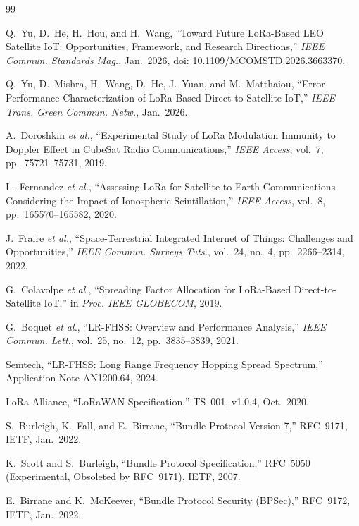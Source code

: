 \documentclass[11pt,a4paper]{article}
\begin{document}
\begin{thebibliography}{99}

Q.~Yu, D.~He, H.~Hou, and H.~Wang, ``Toward Future LoRa-Based LEO Satellite IoT: Opportunities, Framework, and Research Directions,'' \emph{IEEE Commun. Standards Mag.}, Jan.~2026, doi: 10.1109/MCOMSTD.2026.3663370.

Q.~Yu, D.~Mishra, H.~Wang, D.~He, J.~Yuan, and M.~Matthaiou, ``Error Performance Characterization of LoRa-Based Direct-to-Satellite IoT,'' \emph{IEEE Trans. Green Commun. Netw.}, Jan.~2026.

A.~Doroshkin \emph{et al.}, ``Experimental Study of LoRa Modulation Immunity to Doppler Effect in CubeSat Radio Communications,'' \emph{IEEE Access}, vol.~7, pp.~75721--75731, 2019.

L.~Fernandez \emph{et al.}, ``Assessing LoRa for Satellite-to-Earth Communications Considering the Impact of Ionospheric Scintillation,'' \emph{IEEE Access}, vol.~8, pp.~165570--165582, 2020.

J.~Fraire \emph{et al.}, ``Space-Terrestrial Integrated Internet of Things: Challenges and Opportunities,'' \emph{IEEE Commun. Surveys Tuts.}, vol.~24, no.~4, pp.~2266--2314, 2022.

G.~Colavolpe \emph{et al.}, ``Spreading Factor Allocation for LoRa-Based Direct-to-Satellite IoT,'' in \emph{Proc. IEEE GLOBECOM}, 2019.

G.~Boquet \emph{et al.}, ``LR-FHSS: Overview and Performance Analysis,'' \emph{IEEE Commun. Lett.}, vol.~25, no.~12, pp.~3835--3839, 2021.

Semtech, ``LR-FHSS: Long Range Frequency Hopping Spread Spectrum,'' Application Note AN1200.64, 2024.

LoRa Alliance, ``LoRaWAN Specification,'' TS~001, v1.0.4, Oct.~2020.

S.~Burleigh, K.~Fall, and E.~Birrane, ``Bundle Protocol Version 7,'' RFC~9171, IETF, Jan.~2022.

K.~Scott and S.~Burleigh, ``Bundle Protocol Specification,'' RFC~5050 (Experimental, Obsoleted by RFC~9171), IETF, 2007.

E.~Birrane and K.~McKeever, ``Bundle Protocol Security (BPSec),'' RFC~9172, IETF, Jan.~2022.


\end{thebibliography}
\end{document}
